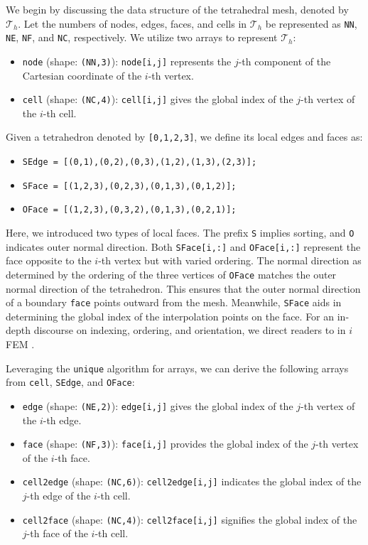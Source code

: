 \documentclass[mathpazo]{cicp}
\begin{document}
We begin by discussing the data structure of the tetrahedral mesh, denoted by
\(\mathcal T_h\). Let the numbers of nodes, edges, faces, and cells in
\(\mathcal T_h\) be represented as \lstinline{NN}, \lstinline{NE},
\lstinline{NF}, and \lstinline{NC}, respectively. We utilize two arrays to
represent \(\mathcal T_h\):
\begin{itemize}
  \item \lstinline{node} (shape: \lstinline{(NN,3)}): \lstinline{node[i,j]} represents the $j$-th component of the Cartesian coordinate of the $i$-th vertex.
  \item \lstinline{cell} (shape: \lstinline{(NC,4)}): \lstinline{cell[i,j]} gives the global index of the $j$-th vertex of the $i$-th cell.
\end{itemize}
Given a tetrahedron denoted by \lstinline{[0,1,2,3]}, we define its local edges and faces as:
\begin{itemize}
  \item \lstinline{SEdge = [(0,1),(0,2),(0,3),(1,2),(1,3),(2,3)];}
  \item \lstinline{SFace = [(1,2,3),(0,2,3),(0,1,3),(0,1,2)];}
  \item \lstinline{OFace = [(1,2,3),(0,3,2),(0,1,3),(0,2,1)];}
\end{itemize}
Here, we introduced two types of local faces. The prefix \lstinline{S} implies
sorting, and \lstinline{O} indicates outer normal direction. Both
\lstinline{SFace[i,:]} and \lstinline{OFace[i,:]} represent the face opposite to
the $i$-th vertex but with varied ordering. The normal direction as determined
by the ordering of the three vertices of \lstinline{OFace} matches the outer
normal direction of the tetrahedron. This ensures that the outer normal
direction of a boundary \lstinline{face} points outward from the mesh.
Meanwhile, \lstinline{SFace} aids in determining the global index of the
interpolation points on the face. For an in-depth discourse on indexing,
ordering, and orientation, we direct readers to  in $i$FEM
\cite{Chen.L2008c}.

Leveraging the \lstinline{unique} algorithm for arrays, we can derive the
following arrays from \lstinline{cell}, \lstinline{SEdge}, and
\lstinline{OFace}:
\begin{itemize}
  \item \lstinline{edge} (shape: \lstinline{(NE,2)}): \lstinline{edge[i,j]} gives the global index of the $j$-th vertex of the $i$-th edge.
  \item \lstinline{face} (shape: \lstinline{(NF,3)}): \lstinline{face[i,j]} provides the global index of the $j$-th vertex of the $i$-th face.
  \item \lstinline{cell2edge} (shape: \lstinline{(NC,6)}): \lstinline{cell2edge[i,j]} indicates the global index of the $j$-th edge of the $i$-th cell.
  \item \lstinline{cell2face} (shape: \lstinline{(NC,4)}): \lstinline{cell2face[i,j]} signifies the global index of the $j$-th face of the $i$-th cell.
\end{itemize}
\end{document}
